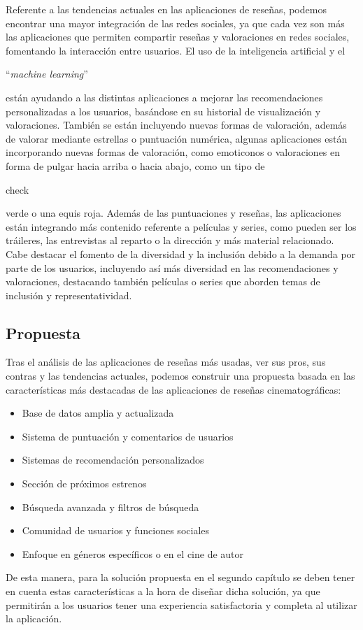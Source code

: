 Referente a las tendencias actuales en las aplicaciones de reseñas, podemos encontrar una mayor 
integración de las redes sociales, ya que cada vez son más las aplicaciones que permiten compartir 
reseñas y valoraciones en redes sociales, fomentando la interacción entre usuarios. El uso de la 
inteligencia artificial y el \begin{otherlanguage}{english}``\textit{machine 
learning}''\end{otherlanguage} \cite{MachLear} están ayudando a las distintas aplicaciones a mejorar 
las recomendaciones personalizadas a los usuarios, basándose en su historial de visualización y 
valoraciones. También se están incluyendo nuevas formas de valoración, además de valorar mediante 
estrellas o puntuación numérica, algunas aplicaciones están incorporando nuevas formas de valoración, 
como emoticonos o valoraciones en forma de pulgar hacia arriba o hacia abajo, como un tipo de 
\begin{otherlanguage}{english}check \end{otherlanguage} verde o una equis roja. Además de las 
puntuaciones y reseñas, las aplicaciones están integrando más contenido referente a películas y 
series, como pueden ser los tráileres, las entrevistas al reparto o la dirección y más material 
relacionado. Cabe destacar el fomento de la diversidad y la inclusión debido a la demanda por parte de 
los usuarios, incluyendo así más diversidad en las recomendaciones y valoraciones, destacando también 
películas o series que aborden temas de inclusión y representatividad.

\subsection{Propuesta}

Tras el análisis de las aplicaciones de reseñas más usadas, ver sus pros, sus contras y las tendencias 
actuales, podemos construir una propuesta basada en las características más destacadas de las 
aplicaciones de reseñas cinematográficas:

\begin{itemize}
\item Base de datos amplia y actualizada
\item Sistema de puntuación y comentarios de usuarios
\item Sistemas de recomendación personalizados
\item Sección de próximos estrenos
\item Búsqueda avanzada y filtros de búsqueda
\item Comunidad de usuarios y funciones sociales
\item Enfoque en géneros específicos o en el cine de autor
\end{itemize}

De esta manera, para la solución propuesta en el segundo capítulo se deben tener en cuenta estas 
características a la hora de diseñar dicha solución, ya que permitirán a los usuarios tener una 
experiencia satisfactoria y completa al utilizar la aplicación.
